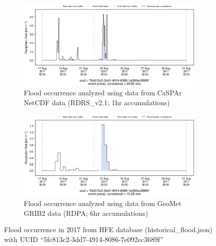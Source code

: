 \documentclass[10pt,a4paper,titlepage,parskip]{scrartcl}
\begin{document}
\begin{figure}[h]
	\begin{subfigure}[a]{1.0\textwidth}
		\centering
		\includegraphics[width=\linewidth]{figures/compare_Geomet_CaSPAr/interpolated_at_stations_occurrence_794_identified-timesteps_RDRS_v2.1.png}
		\caption{Flood occurrence analyzed using data from CaSPAr NetCDF data (RDRS\_v2.1; 1hr accumulations)}
	\end{subfigure}
	\par\bigskip\bigskip
	\begin{subfigure}[b]{1.0\textwidth}
		\centering
		\includegraphics[width=\linewidth]{figures/compare_Geomet_CaSPAr/interpolated_at_stations_occurrence_794_identified-timesteps_rdpa:10km:6f.png}
		\caption{Flood occurrence analyzed using data from GeoMet GRIB2 data (RDPA; 6hr accumulations)}
	\end{subfigure}
	\par\bigskip\bigskip
	\caption{Flood occurrence in 2017 from HFE database (historical\_flood.json) with UUID ``5fc813c2-3dd7-4914-8086-7e092ec3689f''}
\end{figure}
\pagebreak
\end{document}
